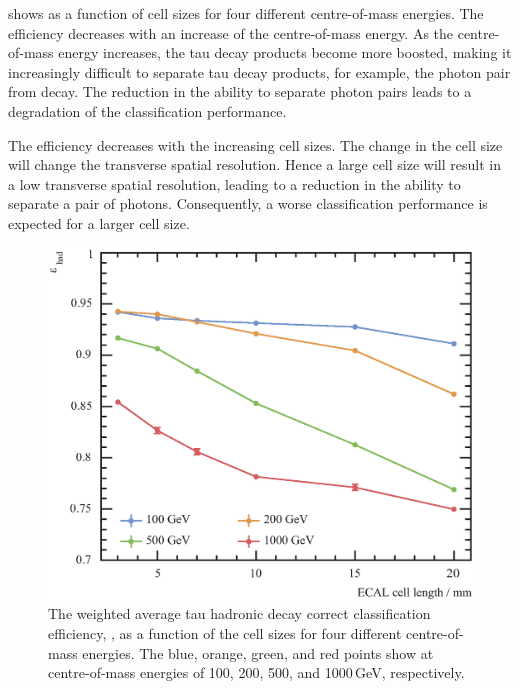 
 shows \tauHad as a function of \ECAL cell sizes for four different centre-of-mass energies. The efficiency \tauHad decreases with an increase of the centre-of-mass energy. As the centre-of-mass energy increases, the tau decay products become more boosted, making it increasingly difficult to separate tau decay products, for example, the photon pair from \Ppizero decay. The reduction in the ability to separate photon pairs leads to a degradation of  the classification performance.

 The efficiency \tauHad decreases with the  increasing \ECAL cell sizes. The change in the \ECAL cell size will change the \ECAL transverse spatial resolution. Hence a large cell size will result in a low transverse spatial resolution, leading to a reduction in the ability to separate a pair of photons. Consequently, a worse classification performance is expected for a larger \ECAL cell size.


\begin{figure}[htbp]
\centering %
\includegraphics[width=.85\textwidth]{tau/plots3/hadronicEff2}
\caption[The tau hadronic decay efficiency as a function of  the \ECAL cell sizes at different \sqrtS with the \ILD detector model.]
{The weighted average tau hadronic decay correct classification efficiency, \tauHad, as a function of  the \ECAL cell sizes for four different centre-of-mass energies. The blue, orange, green, and red points  show \tauHad at centre-of-mass energies of 100, 200, 500, and 1000\,GeV, respectively.}
\label{fig:TauHadronicEfficiency}
\end{figure}

